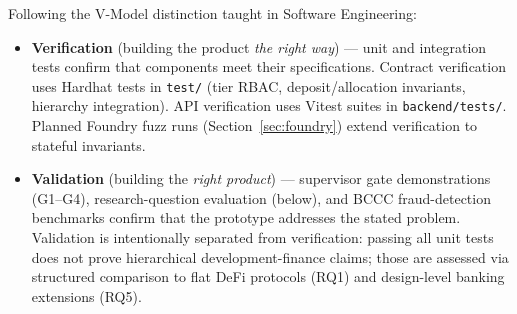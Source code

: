 \documentclass[12pt,a4paper]{report}
\begin{document}
Following the V-Model distinction taught in Software Engineering:

\begin{itemize}[noitemsep]
\item \textbf{Verification} (building the product \textit{the right way}) --- unit and integration tests confirm that components meet their specifications. Contract verification uses Hardhat tests in \texttt{test/} (tier RBAC, deposit/allocation invariants, hierarchy integration). API verification uses Vitest suites in \texttt{backend/tests/}. Planned Foundry fuzz runs (Section~\ref{sec:foundry}) extend verification to stateful invariants.
\item \textbf{Validation} (building the \textit{right product}) --- supervisor gate demonstrations (G1--G4), research-question evaluation (below), and BCCC fraud-detection benchmarks confirm that the prototype addresses the stated problem. Validation is intentionally separated from verification: passing all unit tests does not prove hierarchical development-finance claims; those are assessed via structured comparison to flat DeFi protocols (RQ1) and design-level banking extensions (RQ5).
\end{itemize}
\end{document}
